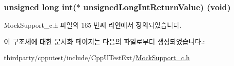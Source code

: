 \subsubsection[{\texorpdfstring{unsigned\+Long\+Int\+Return\+Value}{unsignedLongIntReturnValue}}]{\setlength{\rightskip}{0pt plus 5cm}unsigned long int($\ast$ unsigned\+Long\+Int\+Return\+Value) (void)}\hypertarget{struct_s_mock_support__c_a5dab94d3a7f6424d399581cf4f0f6152}{}\label{struct_s_mock_support__c_a5dab94d3a7f6424d399581cf4f0f6152}


Mock\+Support\+\_\+c.\+h 파일의 165 번째 라인에서 정의되었습니다.



이 구조체에 대한 문서화 페이지는 다음의 파일로부터 생성되었습니다.\+:\begin{DoxyCompactItemize}
\item 
thirdparty/cpputest/include/\+Cpp\+U\+Test\+Ext/\hyperlink{_mock_support__c_8h}{Mock\+Support\+\_\+c.\+h}\end{DoxyCompactItemize}
